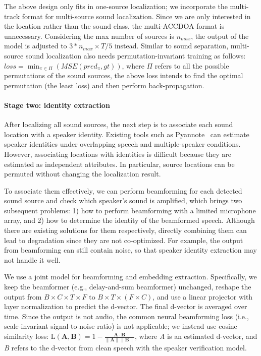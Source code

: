 The above design only fits in one-source localization; we incorporate the multi-track \cite{cao2021improved} format for multi-source sound localization. Since we are only interested in the location rather than the sound class, the multi-ACCDOA \cite{shimada2022multi} format is unnecessary.
Considering the max number of sources is $n_{max}$, the output of the model is adjusted to $3*n_{max} \times T/5$ instead. Similar to sound separation, multi-source sound localization also needs permutation-invariant training as follows:
\(loss = \min_{\pi \in \Pi} (MSE(pred_\pi, gt))
\), where $\Pi$ refers to all the possible permutations of the sound sources, the above loss intends to find the optimal permutation (the least loss) and then perform back-propagation. 


\paragraph{Stage two: identity extraction}
After localizing all sound sources, the next step is to associate each sound location with a speaker identity. Existing tools such as Pyannote~\cite{bredin2023pyannote} can estimate speaker identities under overlapping speech and multiple-speaker conditions.
However, associating locations with identities is difficult because they are estimated as independent attributes. In particular, source locations can be permuted without changing the localization result.

To associate them effectively, we can perform beamforming for each detected sound source and check which speaker's sound is amplified, which brings two subsequent problems: 1) how to perform beamforming with a limited microphone array, and 2) how to determine the identity of the beamformed speech. Although there are existing solutions for them respectively, directly combining them can lead to degradation since they are not co-optimized. 
For example, the output from beamforming can still contain noise, so that speaker identity extraction may not handle it well.

We use a joint model for beamforming and embedding extraction. Specifically, we keep the beamformer (e.g., delay-and-sum beamformer) unchanged, reshape the output from \(B \times C \times T \times F\) to \(B \times T \times (F \times C)\), and use a linear projector with layer normalization to predict the d-vector. The final d-vector is averaged over time. Since the output is not audio, the common neural beamforming loss (i.e., scale-invariant signal-to-noise ratio) is not applicable; we instead use cosine similarity loss:
\(\text{L}(\mathbf{A}, \mathbf{B}) = 1- \frac{\mathbf{A} \cdot \mathbf{B}}{\|\mathbf{A}\| \|\mathbf{B}\|}\),
where \textit{A} is an estimated d-vector, and \textit{B} refers to the d-vector from clean speech with the speaker verification model.

